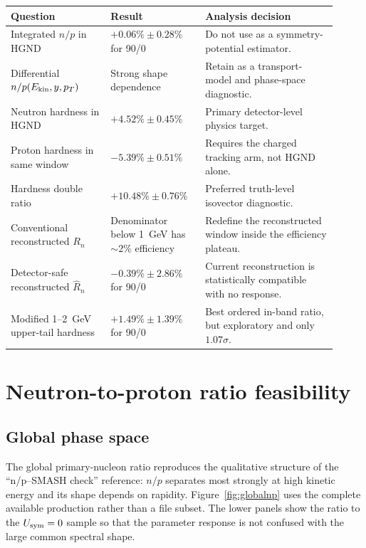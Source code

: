 \documentclass[11pt,a4paper]{article}
\newcommand{\Usym}{U_{\rm sym}}
\newcommand{\Ekin}{E_{\rm kin}}
\begin{document}
\begin{center}
\begin{tabular}{p{0.29\linewidth}p{0.25\linewidth}p{0.37\linewidth}}
\toprule
Question & Result & Analysis decision \\
\midrule
Integrated $n/p$ in HGND & $+0.06\%\pm0.28\%$ for 90/0 & Do not use as a
symmetry-potential estimator. \\
Differential $n/p(\Ekin,y,p_T)$ & Strong shape dependence & Retain as a
transport-model and phase-space diagnostic. \\
Neutron hardness in HGND & $+4.52\%\pm0.45\%$ & Primary detector-level
physics target. \\
Proton hardness in same window & $-5.39\%\pm0.51\%$ & Requires the charged
tracking arm, not HGND alone. \\
Hardness double ratio & $+10.48\%\pm0.76\%$ & Preferred truth-level
isovector diagnostic. \\
Conventional reconstructed $R_n$ & Denominator below 1~GeV has $\sim2\%$
efficiency & Redefine the reconstructed window inside the efficiency plateau. \\
Detector-safe reconstructed $\widehat R_n$ & $-0.39\%\pm2.86\%$ for 90/0 &
Current reconstruction is statistically compatible with no response. \\
Modified 1--2~GeV upper-tail hardness & $+1.49\%\pm1.39\%$ for 90/0 &
Best ordered in-band ratio, but exploratory and only $1.07\sigma$. \\
\bottomrule
\end{tabular}
\end{center}

\section{Neutron-to-proton ratio feasibility}

\subsection{Global phase space}

The global primary-nucleon ratio reproduces the qualitative structure of the
``n/p--SMASH check'' reference: $n/p$ separates most strongly at high kinetic
energy and its shape depends on rapidity.  Figure~\ref{fig:globalnp} uses the
complete available production rather than a file subset.  The lower panels
show the ratio to the $\Usym=0$ sample so that the parameter response is not
confused with the large common spectral shape.
\end{document}
